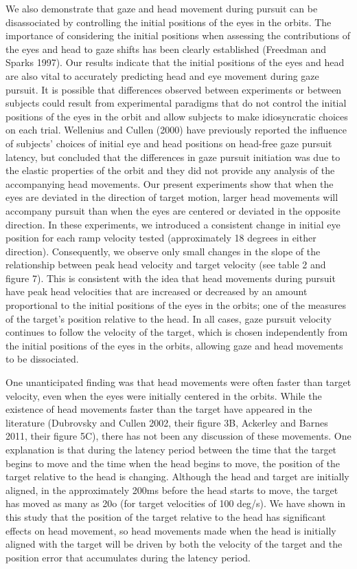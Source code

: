 \documentclass[12pt]{article}
\begin{document}
We also demonstrate that gaze and head movement during pursuit can be disassociated by controlling the initial positions of the eyes in the orbits. The importance of considering the initial positions when assessing the contributions of the eyes and head to gaze shifts has been clearly established (Freedman and Sparks 1997).  Our results indicate that the initial positions of the eyes and head are also vital to accurately predicting head and eye movement during gaze pursuit. It is possible that differences observed between experiments or between subjects could result from experimental paradigms that do not control the initial positions of the eyes in the orbit and allow subjects to make idiosyncratic choices on each trial. Wellenius and Cullen (2000) have previously reported the influence of subjects’ choices of initial eye and head positions on head-free gaze pursuit latency, but concluded that the differences in gaze pursuit initiation was due to the elastic properties of the orbit and they did not provide any analysis of the accompanying head movements. Our present experiments show that when the eyes are deviated in the direction of target motion, larger head movements will accompany pursuit than when the eyes are centered or deviated in the opposite direction. In these experiments, we introduced a consistent change in initial eye position for each ramp velocity tested (approximately 18 degrees in either direction).  Consequently, we observe only small changes in the slope of the relationship between peak head velocity and target velocity (see table 2 and figure 7). This is consistent with the idea that head movements during pursuit have peak head velocities that are increased or decreased by an amount proportional to the initial positions of the eyes in the orbits; one of the measures of the target’s position relative to the head. In all cases, gaze pursuit velocity continues to follow the velocity of the target, which is chosen independently from the initial positions of the eyes in the orbits, allowing gaze and head movements to be dissociated. 

One unanticipated finding was that head movements were often faster than target velocity, even when the eyes were initially centered in the orbits. While the existence of head movements faster than the target have appeared in the literature (Dubrovsky and Cullen 2002, their figure 3B, Ackerley and Barnes 2011, their figure 5C), there has not been any discussion of these movements.  One explanation is that during the latency period between the time that the target begins to move and the time when the head begins to move, the position of the target relative to the head is changing. Although the head and target are initially aligned, in the approximately 200ms before the head starts to move, the target has moved as many as 20o (for target velocities of 100 deg/s). We have shown in this study that the position of the target relative to the head has significant effects on head movement, so head movements made when the head is initially aligned with the target will be driven by both the velocity of the target and the position error that accumulates during the latency period. 
\end{document}
